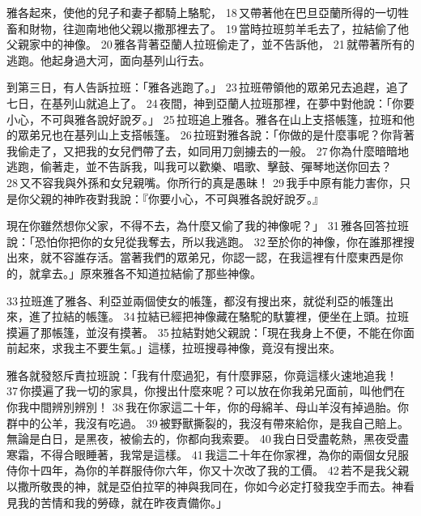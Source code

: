 雅各起來，使他的兒子和妻子都騎上駱駝， 18 又帶著他在巴旦亞蘭所得的一切牲畜和財物，往迦南地他父親以撒那裡去了。 19 當時拉班剪羊毛去了，拉結偷了他父親家中的神像。 20 雅各背著亞蘭人拉班偷走了，並不告訴他， 21 就帶著所有的逃跑。他起身過大河，面向基列山行去。

到第三日，有人告訴拉班：「雅各逃跑了。」 23 拉班帶領他的眾弟兄去追趕，追了七日，在基列山就追上了。 24 夜間，神到亞蘭人拉班那裡，在夢中對他說：「你要小心，不可與雅各說好說歹。」 25 拉班追上雅各。雅各在山上支搭帳篷，拉班和他的眾弟兄也在基列山上支搭帳篷。 26 拉班對雅各說：「你做的是什麼事呢？你背著我偷走了，又把我的女兒們帶了去，如同用刀劍擄去的一般。 27 你為什麼暗暗地逃跑，偷著走，並不告訴我，叫我可以歡樂、唱歌、擊鼓、彈琴地送你回去？ 28 又不容我與外孫和女兒親嘴。你所行的真是愚昧！ 29 我手中原有能力害你，只是你父親的神昨夜對我說：『你要小心，不可與雅各說好說歹。』

現在你雖然想你父家，不得不去，為什麼又偷了我的神像呢？」 31 雅各回答拉班說：「恐怕你把你的女兒從我奪去，所以我逃跑。 32 至於你的神像，你在誰那裡搜出來，就不容誰存活。當著我們的眾弟兄，你認一認，在我這裡有什麼東西是你的，就拿去。」原來雅各不知道拉結偷了那些神像。

33 拉班進了雅各、利亞並兩個使女的帳篷，都沒有搜出來，就從利亞的帳篷出來，進了拉結的帳篷。 34 拉結已經把神像藏在駱駝的馱簍裡，便坐在上頭。拉班摸遍了那帳篷，並沒有摸著。 35 拉結對她父親說：「現在我身上不便，不能在你面前起來，求我主不要生氣。」這樣，拉班搜尋神像，竟沒有搜出來。

雅各就發怒斥責拉班說：「我有什麼過犯，有什麼罪惡，你竟這樣火速地追我！ 37 你摸遍了我一切的家具，你搜出什麼來呢？可以放在你我弟兄面前，叫他們在你我中間辨別辨別！ 38 我在你家這二十年，你的母綿羊、母山羊沒有掉過胎。你群中的公羊，我沒有吃過。 39 被野獸撕裂的，我沒有帶來給你，是我自己賠上。無論是白日，是黑夜，被偷去的，你都向我索要。 40 我白日受盡乾熱，黑夜受盡寒霜，不得合眼睡著，我常是這樣。 41 我這二十年在你家裡，為你的兩個女兒服侍你十四年，為你的羊群服侍你六年，你又十次改了我的工價。 42 若不是我父親以撒所敬畏的神，就是亞伯拉罕的神與我同在，你如今必定打發我空手而去。神看見我的苦情和我的勞碌，就在昨夜責備你。」


